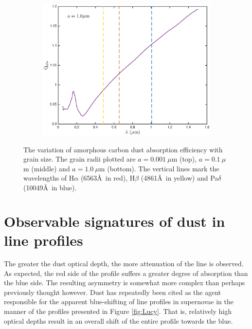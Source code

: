 \begin{figure}
\begin{subfigure}{\textwidth}
\centering
\includegraphics[trim =30 10 45 25,clip=true,scale=0.55]{chapters/chapter4/images/Qabs_a1_0}
\end{subfigure}
\caption{The variation of amorphous carbon dust absorption efficiency with grain size. The grain radii plotted are $a=0.001~\mu$m (top), $a=0.1~\mu$m (middle) and $a=1.0~\mu$m (bottom).  The vertical lines mark the wavelengths of H$\alpha$ (6563\AA\ in red), H$\beta$ (4861\AA\ in yellow) and Pa$\delta$ (10049\AA\ in blue).}
\label{wav_dep2}
\end{figure}






\section{Observable signatures of dust in line profiles}
\label{asym}

The greater the dust optical depth, the more attenuation of the line 
is observed.  As expected, the red side of the profile suffers a greater 
degree of absorption than the blue side.  The resulting asymmetry is 
somewhat more complex than perhaps previously thought however.  Dust has 
repeatedly been cited as the agent responsible for the apparent 
blue-shifting of line profiles in supernovae in the manner of the profiles 
presented in Figure \ref{fig:Lucy}.  That is, relatively high optical 
depths result in an overall shift of the entire profile towards the blue.

